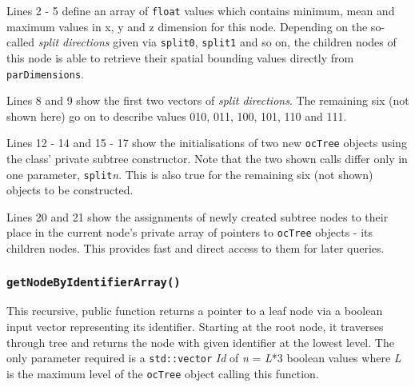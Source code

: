 Lines 2 - 5 define an array of \texttt{float} values which contains minimum, mean and maximum values in x, y and z dimension for this node. Depending on the so-called \textit{split directions} given via \texttt{split0}, \texttt{split1} and so on, the children nodes of this node is able to retrieve their spatial bounding values directly from \texttt{parDimensions}.

Lines 8 and 9 show the first two vectors of \textit{split directions}. The remaining six (not shown here) go on to describe values 010, 011, 100, 101, 110 and 111.

Lines 12 - 14 and 15 - 17 show the initialisations of two new \texttt{ocTree} objects using the class' private subtree constructor. Note that the two shown calls differ only in one parameter, \texttt{split}\textit{n}. This is also true for the remaining six (not shown) objects to be constructed.

Lines 20 and 21 show the assignments of newly created subtree nodes to their place in the current node's private array of pointers to \texttt{ocTree} objects - its children nodes. This provides fast and direct access to them for later queries. 

	\subsubsection{\texttt{getNodeByIdentifierArray()}}
	\label{set:getNodeByIdentifierArray}
This recursive, public function returns a pointer to a leaf node via a boolean input vector representing its identifier. Starting at the root node, it traverses through tree and returns the node with given identifier at the lowest level. The only parameter required is a \texttt{std::vector} \textit{Id} of \textit{n} = \textit{L}*3 boolean values where \textit{L} is the maximum level of the \texttt{ocTree} object calling this function.

